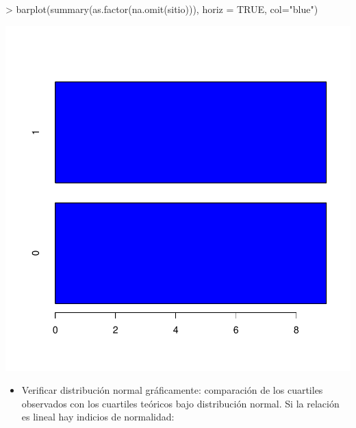 \documentclass[12pt]{article}
\begin{document}
\begin{Schunk}
\begin{Sinput}
> barplot(summary(as.factor(na.omit(sitio))), horiz = TRUE, col="blue")
\end{Sinput}
\end{Schunk}
\includegraphics{ensayo-019}

  \begin{itemize}
  \item Verificar distribución normal gráficamente: comparación de los cuartiles observados con los cuartiles teóricos bajo distribución normal. Si la relación es lineal hay indicios de normalidad:
  \end{itemize}
  
\end{document}
